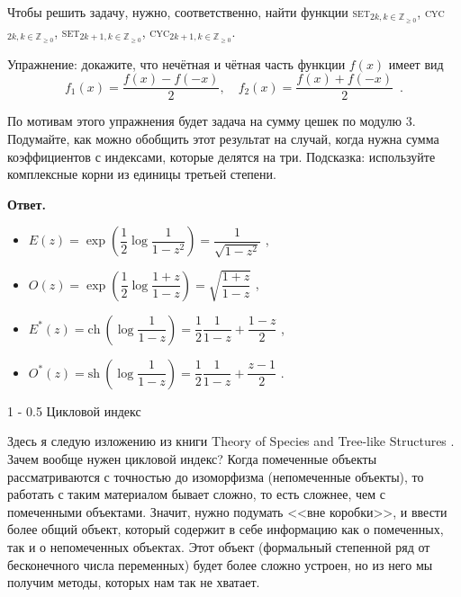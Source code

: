 \documentclass[a5paper]{article}
\makeatletter
\theoremstyle{definition}
\renewcommand{\section}{\@startsection
{section}%
{1}%
{\z@}%
{-\baselineskip}%
{0.5\baselineskip}%
{\centering\large\scshape}} %
\makeatother
\begin{document}
Чтобы решить задачу, нужно, соответственно, найти функции
\textsc{set}$_{2k, k \in \mathbb Z_{\geq 0}}$, \textsc{cyc}$_{2k, k \in \mathbb Z_{\geq 0}}$,
\textsc{set}$_{2k + 1, k \in \mathbb Z_{\geq 0}}$, \textsc{cyc}$_{2k + 1, k \in \mathbb
Z_{\geq 0}}$.

Упражнение: докажите, что нечётная и чётная часть функции \( f(x) \) имеет вид
\[
    f_{1}(x) = \dfrac{f(x) - f(-x)}{2}, \quad
    f_{2}(x) = \dfrac{f(x) + f(-x)}{2} \enspace . 
\]

По мотивам этого упражнения будет задача на сумму цешек по модулю 3. Подумайте,
как можно обобщить этот результат на случай, когда нужна сумма коэффициентов с
индексами, которые делятся на три. Подсказка: используйте комплексные корни из
единицы третьей степени.

\textbf{Ответ.}

\begin{itemize}
	\item \( E(z) = \exp\left(\dfrac12 \log \dfrac{1}{1-z^2}\right) = 
	\dfrac{1}{\sqrt{1 - z^2}} \) , 
	\item \( O(z) = \exp\left(\dfrac12 \log 
	\dfrac{1+z}{1-z}\right) = 
	\sqrt{\dfrac{1+z}{1-z}} \) ,
	\item \( E^{*}(z) = \mathrm{ch}\ \left(\log \dfrac{1}{1 - z}\right) = 
	\dfrac12 \dfrac{1}{1 - z} + \dfrac{1 - z}{2} \) ,
    \item
	\( O^{*}(z) = \mathrm{sh}\ \left( \log \dfrac{1}{1 - z}\right) = 
	\dfrac12\dfrac{1}{1 - z} + \dfrac{z - 1}{2} \) .
\end{itemize}

\section{Цикловой индекс}

Здесь я следую изложению из книги Theory of Species and Tree-like Structures 
\cite{species}. Зачем вообще нужен цикловой индекс? Когда помеченные
объекты рассматриваются с точностью до изоморфизма (непомеченные объекты), то
работать с таким материалом бывает сложно, то есть сложнее, чем с помеченными
объектами. Значит, нужно подумать <<вне коробки>>, и ввести более общий объект,
который содержит в себе информацию как о помеченных, так и о непомеченных
объектах. Этот объект (формальный степенной ряд от бесконечного числа
переменных) будет более сложно устроен, но из него мы получим методы, которых
нам так не хватает.
\end{document}
